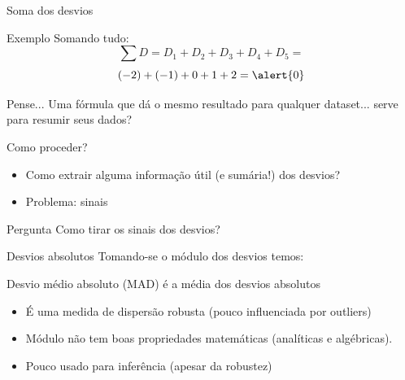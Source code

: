 \documentclass{beamer}
\begin{document}
\begin{frame}{Soma dos desvios}
  \begin{exampleblock}{Exemplo}
    Somando tudo:
    \begin{displaymath}
    \sum D = D_1 + D_2 + D_3 + D_4 + D_5 =
  \end{displaymath}
  \begin{displaymath}
    (-2) + (-1) + 0 + 1 + 2 = \alert{0}
  \end{displaymath}
  \end{exampleblock}
  \begin{block}{Pense...}
    Uma fórmula que dá o mesmo resultado para qualquer dataset... serve para resumir seus dados?
  \end{block}
\end{frame}

\begin{frame}{Como proceder?}
  \begin{itemize}
  \item Como extrair alguma informação útil (e sumária!) dos desvios?
  \item Problema: sinais
  \end{itemize}
  \begin{block}{Pergunta}
    Como tirar os sinais dos desvios?
  \end{block}
\end{frame}

\begin{frame}{Desvios absolutos}
  Tomando-se o módulo dos desvios temos:

  \begin{definition}
    Desvio médio absoluto (MAD) é a média dos desvios absolutos
  \end{definition}

  \begin{itemize}
  \item É uma medida de dispersão robusta (pouco influenciada por
    outliers)
  \item Módulo não tem boas propriedades matemáticas (analíticas e
    algébricas).
  \item Pouco usado para inferência (apesar da robustez)
  \end{itemize}
\end{frame}
\end{document}
